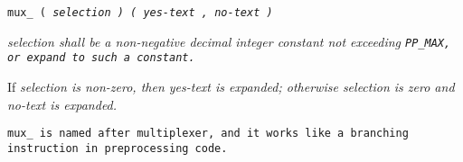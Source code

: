 
\tt{mux_ (} \it{selection} \tt{) (} \it{yes-text} \tt{,} \it{no-text} \tt{)}


\it{selection} shall be a non-negative decimal integer constant
not exceeding \tt{PP_MAX}, or expand to such a constant.


If \it{selection} is non-zero, then \it{yes-text} is expanded;
otherwise \it{selection} is zero and \it{no-text} is expanded.

\note \tt{mux_} is named after multiplexer,
and it works like a branching instruction in preprocessing code.
